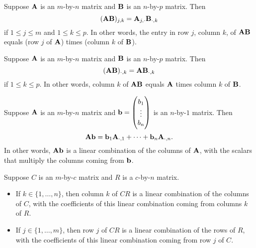 \documentclass{extarticle}
\begin{document}
\begin{corollary}
    Suppose \(\mathbf{A}\) is an \(m\)-by-\(n\) matrix and \(\mathbf{B}\) is an \(n\)-by-\(p\) matrix. Then 
    \[(\mathbf{A} \mathbf{B})_{j, k} = \mathbf{A}_{j, \cdot} \mathbf{B}_{\cdot, k}\]
    if \(1 \leq j \leq m\) and \(1 \leq k \leq p\). In other words, the entry in row \(j\), 
    column \(k\), of \(\mathbf{A} \mathbf{B}\) equals (row \(j\) of \(\mathbf{A}\)) times (column \(k\) of \(\mathbf{B}\)). 
\end{corollary}

\begin{corollary}
Suppose \(\mathbf{A}\) is an \(m\)-by-\(n\) matrix and \(\mathbf{B}\) is an \(n\)-by-\(p\) matrix. Then 
\[(\mathbf{A} \mathbf{B})_{\cdot, k} = \mathbf{A} \mathbf{B}_{\cdot, k}\]
if \(1 \leq k \leq p\). In other words, column \(k\) of \(\mathbf{A} \mathbf{B}\) equals \(\mathbf{A}\) times 
column \(k\) of \(\mathbf{B}\). 
\end{corollary}

\begin{corollary}
    Suppose \(\mathbf{A}\) is an \(m\)-by-\(n\) matrix and \(\mathbf{b} = \begin{pmatrix}
        b_1 \\ 
        \vdots \\ 
        b_n
    \end{pmatrix}\) is an \(n\)-by-\(1\) matrix. Then 
    \[\mathbf{A} \mathbf{b} = \mathbf{b}_1 \mathbf{A}_{\cdot, 1} + \cdots + \mathbf{b}_n \mathbf{A}_{\cdot, n}.\]
    In other words, \(\mathbf{A} \mathbf{b}\) is a linear combination of the columns of \(\mathbf{A}\), with the scalars 
    that multiply the columns coming from \(\mathbf{b}\). 
\end{corollary}

\begin{thm}
    Suppose \(C\) is an \(m\)-by-\(c\) matrix and \(R\) is a \(c\)-by-\(n\) matrix. 

    \begin{itemize}
        \item If \(k \in \{1, \ldots, n\}\), then column \(k\) of \(CR\) is a linear combination 
        of the columns of \(C\), with the coefficients of this linear combination coming from 
        columns \(k\) of \(R\). 
        \item If \(j \in \{1, \ldots, m\}\), then row \(j\) of \(CR\) is a linear combination of 
        the rows of \(R\), with the coefficients of this linear combination coming from row 
        \(j\) of \(C\). 
    \end{itemize}
\end{thm}
\end{document}
